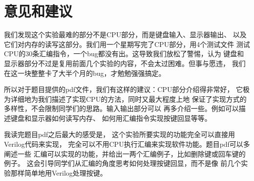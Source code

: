 \documentclass[12pt,a4paper,UTF8]{article}
\begin{document}
\section{意见和建议}
我们发现这个实验最难的部分不是CPU部分，而是键盘输入、显示器输出、
以及它们对内存的读写这部分。我们用一个星期写完了CPU部分，用4个测试文件
测试CPU的30条汇编指令，一个bug都没有出。这导致我们放松了警惕，认为
键盘和显示器部分不过是复用前面几个实验的内容，不会太过困难。但事与愿违，
我们在这一块整整卡了大半个月的bug，才勉勉强强搞定。

所以对于题目提供的pdf文件，我们有这样的建议：CPU部分介绍得非常好，
它极为详细地为我们描述了实现CPU的方法，同时又最大程度上地
保证了实现方式的多样性，不会限制同学们的思路。输入输出部分可以
再多介绍一些。例如可以描述键盘和显示器如何读写内存、
如何用汇编指令实现按键回显等等。

我读完题目pdf之后最大的感受是，
这个实验所要实现的功能完全可以直接用Verilog代码来实现，
完全可以不用CPU执行汇编来实现软件功能。题目pdf可以多阐述一些
汇编可以实现的功能，并给出一两个汇编例子，比如删除键或回车键的例子。
这会引导同学们从汇编的角度思考如何处理按键回显，而不是像
前几个实验那样简单地用Verilog处理按键。
\end{document}
